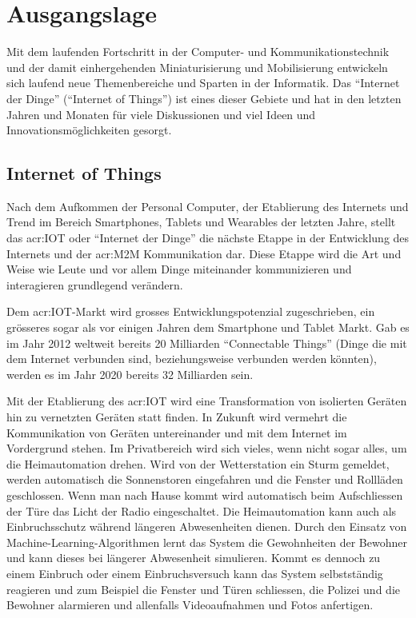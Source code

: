 \chapter{Ausgangslage}

Mit dem laufenden Fortschritt in der Computer- und Kommunikationstechnik und der damit einhergehenden Miniaturisierung und Mobilisierung entwickeln sich laufend neue Themenbereiche und Sparten in der Informatik. Das "`Internet der Dinge"' ("`Internet of Things"') ist eines dieser Gebiete und hat in den letzten Jahren und Monaten für viele Diskussionen und viel Ideen und Innovationsmöglichkeiten gesorgt.

\section{Internet of Things}
Nach dem Aufkommen der Personal Computer, der Etablierung des Internets und Trend im Bereich Smartphones, Tablets und Wearables der letzten Jahre, stellt das \gls{acr:IOT} oder "`Internet der Dinge"' die nächste Etappe in der Entwicklung des Internets und der \gls{acr:M2M} Kommunikation dar. Diese Etappe wird die Art und Weise wie Leute und vor allem Dinge miteinander kommunizieren und interagieren grundlegend verändern.

Dem \gls{acr:IOT}-Markt wird grosses Entwicklungspotenzial zugeschrieben, ein grösseres sogar als vor einigen Jahren dem Smartphone und Tablet Markt. Gab es im Jahr 2012 weltweit bereits 20 Milliarden "`Connectable Things"' (Dinge die mit dem Internet verbunden sind, beziehungsweise verbunden werden könnten), werden es im Jahr 2020 bereits 32 Milliarden sein. \cite[S. 5]{E:EMC:DigitalUniverseOfOpportunities}

Mit der Etablierung des \gls{acr:IOT} wird eine Transformation von isolierten Geräten hin zu vernetzten Geräten statt finden. In Zukunft wird vermehrt die Kommunikation von Geräten untereinander und mit dem Internet im Vordergrund stehen. Im Privatbereich wird sich vieles, wenn nicht sogar alles, um die Heimautomation drehen. Wird von der Wetterstation ein Sturm gemeldet, werden automatisch die Sonnenstoren eingefahren und die Fenster und Rollläden geschlossen. Wenn man nach Hause kommt wird automatisch beim Aufschliessen der Türe das Licht der Radio eingeschaltet. Die Heimautomation kann auch als Einbruchsschutz während längeren Abwesenheiten dienen. Durch den Einsatz von Machine-Learning-Algorithmen lernt das System die Gewohnheiten der Bewohner und kann dieses bei längerer Abwesenheit simulieren. Kommt es dennoch zu einem Einbruch oder einem Einbruchsversuch kann das System selbstständig reagieren und zum Beispiel die Fenster und Türen schliessen, die Polizei und die Bewohner alarmieren und allenfalls Videoaufnahmen und Fotos anfertigen.

